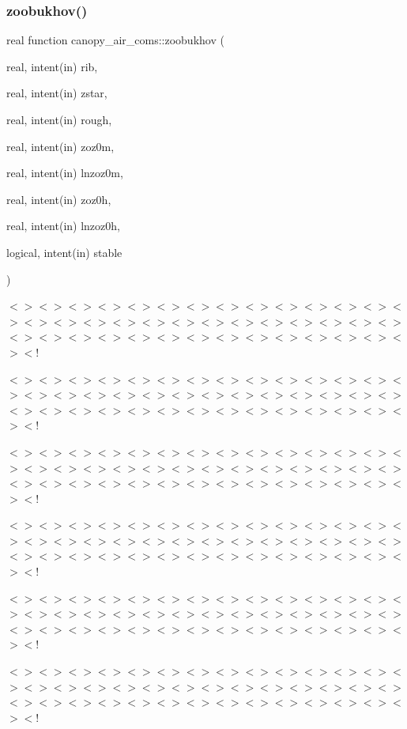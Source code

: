 \subsubsection{\texorpdfstring{zoobukhov()}{zoobukhov()}}
{\footnotesize\ttfamily real function canopy\+\_\+air\+\_\+coms\+::zoobukhov (\begin{DoxyParamCaption}\item[{real, intent(in)}]{rib,  }\item[{real, intent(in)}]{zstar,  }\item[{real, intent(in)}]{rough,  }\item[{real, intent(in)}]{zoz0m,  }\item[{real, intent(in)}]{lnzoz0m,  }\item[{real, intent(in)}]{zoz0h,  }\item[{real, intent(in)}]{lnzoz0h,  }\item[{logical, intent(in)}]{stable }\end{DoxyParamCaption})}

$<$$>$$<$$>$$<$$>$$<$$>$$<$$>$$<$$>$$<$$>$$<$$>$$<$$>$$<$$>$$<$$>$$<$$>$$<$$>$$<$$>$$<$$>$$<$$>$$<$$>$$<$$>$$<$$>$$<$$>$$<$$>$$<$$>$$<$$>$$<$$>$$<$$>$$<$$>$$<$$>$$<$$>$$<$$>$$<$$>$$<$$>$$<$$>$$<$$>$$<$$>$$<$$>$$<$$>$$<$$>$$<$$>$$<$$>$$<$$>$$<$$>$$<$!

$<$$>$$<$$>$$<$$>$$<$$>$$<$$>$$<$$>$$<$$>$$<$$>$$<$$>$$<$$>$$<$$>$$<$$>$$<$$>$$<$$>$$<$$>$$<$$>$$<$$>$$<$$>$$<$$>$$<$$>$$<$$>$$<$$>$$<$$>$$<$$>$$<$$>$$<$$>$$<$$>$$<$$>$$<$$>$$<$$>$$<$$>$$<$$>$$<$$>$$<$$>$$<$$>$$<$$>$$<$$>$$<$$>$$<$$>$$<$$>$$<$$>$$<$!

$<$$>$$<$$>$$<$$>$$<$$>$$<$$>$$<$$>$$<$$>$$<$$>$$<$$>$$<$$>$$<$$>$$<$$>$$<$$>$$<$$>$$<$$>$$<$$>$$<$$>$$<$$>$$<$$>$$<$$>$$<$$>$$<$$>$$<$$>$$<$$>$$<$$>$$<$$>$$<$$>$$<$$>$$<$$>$$<$$>$$<$$>$$<$$>$$<$$>$$<$$>$$<$$>$$<$$>$$<$$>$$<$$>$$<$$>$$<$$>$$<$$>$$<$!

$<$$>$$<$$>$$<$$>$$<$$>$$<$$>$$<$$>$$<$$>$$<$$>$$<$$>$$<$$>$$<$$>$$<$$>$$<$$>$$<$$>$$<$$>$$<$$>$$<$$>$$<$$>$$<$$>$$<$$>$$<$$>$$<$$>$$<$$>$$<$$>$$<$$>$$<$$>$$<$$>$$<$$>$$<$$>$$<$$>$$<$$>$$<$$>$$<$$>$$<$$>$$<$$>$$<$$>$$<$$>$$<$$>$$<$$>$$<$$>$$<$$>$$<$!

$<$$>$$<$$>$$<$$>$$<$$>$$<$$>$$<$$>$$<$$>$$<$$>$$<$$>$$<$$>$$<$$>$$<$$>$$<$$>$$<$$>$$<$$>$$<$$>$$<$$>$$<$$>$$<$$>$$<$$>$$<$$>$$<$$>$$<$$>$$<$$>$$<$$>$$<$$>$$<$$>$$<$$>$$<$$>$$<$$>$$<$$>$$<$$>$$<$$>$$<$$>$$<$$>$$<$$>$$<$$>$$<$$>$$<$$>$$<$$>$$<$$>$$<$!

$<$$>$$<$$>$$<$$>$$<$$>$$<$$>$$<$$>$$<$$>$$<$$>$$<$$>$$<$$>$$<$$>$$<$$>$$<$$>$$<$$>$$<$$>$$<$$>$$<$$>$$<$$>$$<$$>$$<$$>$$<$$>$$<$$>$$<$$>$$<$$>$$<$$>$$<$$>$$<$$>$$<$$>$$<$$>$$<$$>$$<$$>$$<$$>$$<$$>$$<$$>$$<$$>$$<$$>$$<$$>$$<$$>$$<$$>$$<$$>$$<$$>$$<$!

